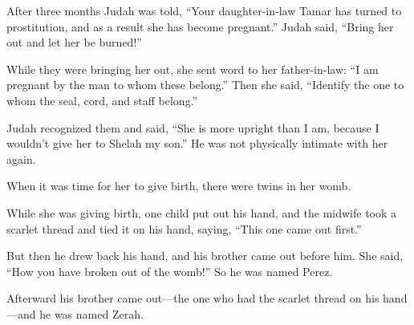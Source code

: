 \begin{scripture}
 After three months Judah was told, ``Your daughter-in-law Tamar has turned to prostitution, and as a result she has become pregnant.'' Judah said, ``Bring her out and let her be burned!''
 While they were bringing her out, she sent word to her father-in-law: ``I am pregnant by the man to whom these belong.'' Then she said, ``Identify the one to whom the seal, cord, and staff belong.''
 Judah recognized them and said, ``She is more upright than I am, because I wouldn't give her to Shelah my son.'' He was not physically intimate with her again.
\everypar{}

 When it was time for her to give birth, there were twins in her womb.
 While she was giving birth, one child put out his hand, and the midwife took a scarlet thread and tied it on his hand, saying, ``This one came out first.''
 But then he drew back his hand, and his brother came out before him. She said, ``How you have broken out of the womb!'' So he was named Perez.
 Afterward his brother came out---the one who had the scarlet thread on his hand---and he was named Zerah.


\end{scripture}
